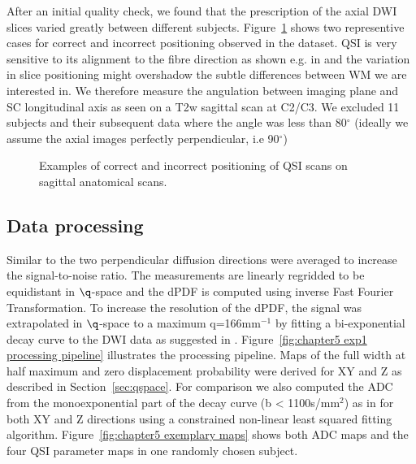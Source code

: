 After an initial quality check, we found that the prescription of the axial \gls{DWI} slices varied greatly between different subjects. Figure~\ref{fig:chapter5 positioning} shows two representive cases for correct and incorrect positioning observed in the dataset. \gls{QSI} is very sensitive to its alignment to the fibre direction as shown e.g. in \citep{Avram:2004} and the variation in slice positioning might overshadow the subtle differences between \gls{WM} we are interested in. We therefore measure the angulation between imaging plane and \gls{SC} longitudinal axis as seen on a T2w sagittal scan at C2/C3. We excluded 11 subjects and their subsequent data where the angle was less than 80$^\circ$ (ideally we assume the axial images perfectly perpendicular, i.e 90$^\circ$)

\begin{figure}
\centering
{}\hspace{0.015\textwidth}
\caption{Examples of correct and incorrect positioning of QSI scans on sagittal anatomical scans.}
\label{fig:chapter5 positioning}
\end{figure}

\subsection{Data processing}
Similar to \citet{Farrell:2008} the two perpendicular diffusion directions were averaged to increase the signal-to-noise ratio. The measurements are linearly regridded to be equidistant in $\q$-space and the  {\gls{dPDF}} is computed using inverse Fast Fourier Transformation. To increase the resolution of the  {\gls{dPDF}}, the signal was extrapolated in $\q$-space to a maximum q=166mm$^{-1}$ by fitting a bi-exponential decay curve to the {\gls{DWI}} data as suggested in \citet{Cohen:2002, Farrell:2008}. Figure~\ref{fig:chapter5 exp1 processing pipeline} illustrates the processing pipeline. Maps of the full width at half maximum and zero displacement probability were derived for XY and Z as described in Section~\ref{sec:qspace}. For comparison we also computed the \gls{ADC} from the monoexponential part of the decay curve (b < 1100s/mm$^2$) as in \citet{Farrell:2008} for both XY and Z directions using a constrained non-linear least squared fitting algorithm. Figure~\ref{fig:chapter5 exemplary maps} shows both \gls{ADC} maps and the four \gls{QSI} parameter maps in one randomly chosen subject.


